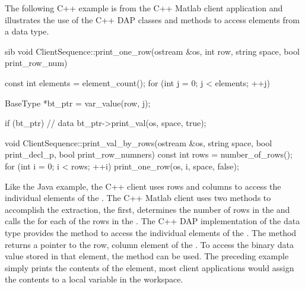 \documentclass{dods-paper}
\begin{document}
The following C++ example is from the C++ Matlab client
application and illustrates the use of the C++ DAP classes
and methods to access elements from a  data type.

\begin{vcode}{sib}
void 
ClientSequence::print_one_row(ostream &os, int row, string space,
                              bool print_row_num)
{

    const int elements = element_count();
    for (int j = 0; j < elements; ++j) {
        BaseType *bt_ptr = var_value(row, j);

        if (bt_ptr) {           // data
            bt_ptr->print_val(os, space, true);
        }
    }

}

void 
ClientSequence::print_val_by_rows(ostream &os, string space,
                                  bool print_decl_p,
                                  bool print_row_numners)
{
    const int rows = number_of_rows();
    for (int i = 0; i < rows; ++i) {
        print_one_row(os, i, space, false);
    }
}
\end{vcode}

Like the Java example, the C++ client uses rows and columns
to access the individual elements of the .  The
C++ Matlab client uses two methods to accomplish the extraction,
the first,  determines the number of
rows in the  and calls the 
for each of the rows in the .  The C++ DAP
implementation of the  data type provides the
 method to access the individual elements
of the .  The  method returns 
a  pointer to the row, column element of the
.  To access the binary data value stored in
that element, the  method  can
be used.  The preceding example simply prints the contents
of the element, most client applications would assign the
contents to a local variable in the workspace.
\end{document}

